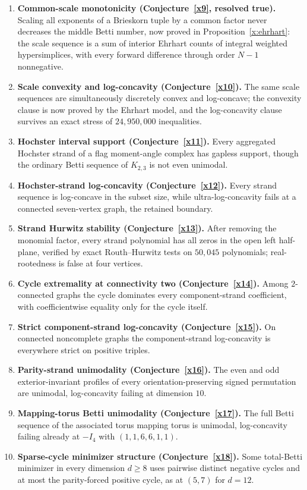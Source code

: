 \documentclass[11pt]{article}
\theoremstyle{definition}
\begin{document}
\begin{enumerate}
\item \textbf{Common-scale monotonicity (Conjecture~\ref{x9}, resolved true).}  Scaling all exponents of a Brieskorn tuple by a common factor never decreases the middle Betti number, now proved in Proposition~\ref{x:ehrhart}: the scale sequence is a sum of interior Ehrhart counts of integral weighted hypersimplices, with every forward difference through order $N-1$ nonnegative.
\item \textbf{Scale convexity and log-concavity (Conjecture~\ref{x10}).}  The same scale sequences are simultaneously discretely convex and log-concave; the convexity clause is now proved by the Ehrhart model, and the log-concavity clause survives an exact stress of $24{,}950{,}000$ inequalities.
\item \textbf{Hochster interval support (Conjecture~\ref{x11}).}  Every aggregated Hochster strand of a flag moment-angle complex has gapless support, though the ordinary Betti sequence of $K_{2,3}$ is not even unimodal.
\item \textbf{Hochster-strand log-concavity (Conjecture~\ref{x12}).}  Every strand sequence is log-concave in the subset size, while ultra-log-concavity fails at a connected seven-vertex graph, the retained boundary.
\item \textbf{Strand Hurwitz stability (Conjecture~\ref{x13}).}  After removing the monomial factor, every strand polynomial has all zeros in the open left half-plane, verified by exact Routh--Hurwitz tests on $50{,}045$ polynomials; real-rootedness is false at four vertices.
\item \textbf{Cycle extremality at connectivity two (Conjecture~\ref{x14}).}  Among $2$-connected graphs the cycle dominates every component-strand coefficient, with coefficientwise equality only for the cycle itself.
\item \textbf{Strict component-strand log-concavity (Conjecture~\ref{x15}).}  On connected noncomplete graphs the component-strand log-concavity is everywhere strict on positive triples.
\item \textbf{Parity-strand unimodality (Conjecture~\ref{x16}).}  The even and odd exterior-invariant profiles of every orientation-preserving signed permutation are unimodal, log-concavity failing at dimension $10$.
\item \textbf{Mapping-torus Betti unimodality (Conjecture~\ref{x17}).}  The full Betti sequence of the associated torus mapping torus is unimodal, log-concavity failing already at $-I_4$ with $(1,1,6,6,1,1)$.
\item \textbf{Sparse-cycle minimizer structure (Conjecture~\ref{x18}).}  Some total-Betti minimizer in every dimension $d\ge8$ uses pairwise distinct negative cycles and at most the parity-forced positive cycle, as at $(5,7)$ for $d=12$.

\end{enumerate}
\end{document}
